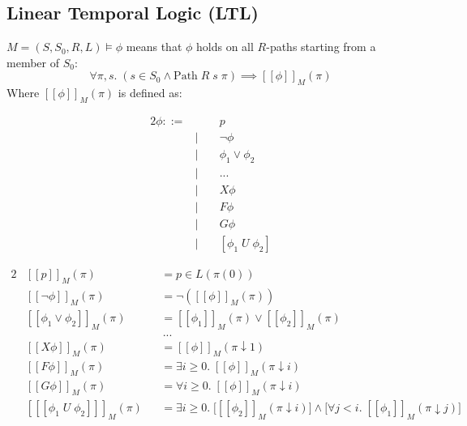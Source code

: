 \documentclass[a4paper, 11pt]{article}
\newcommand{\interp}[2][]{\mathcal{#1}[\![#2]\!]}
\begin{document}
{    \subsection*{Linear Temporal Logic (LTL)}
    {
        \(M = (S,S_0,R,L) \vDash \phi\) means that \(\phi\) holds on all \(R\)-paths starting from a member of \(S_0\):
        \[\forall \pi,s.\; (s \in S_0 \wedge \text{Path}\;R\;s\;\pi) \implies \interp{\phi}_M(\pi)\]
        Where \(\interp{\phi}_M(\pi)\) is defined as:

        \vspace{-8mm}
        \begin{minipage}[t]{0.3\textwidth}
        \begin{alignat*}{2}
        \phi ::=& \; &\;& p \tag*{Atomic proposition} \\
                & | && \neg \phi \tag*{Negation} \\
                & | && \phi_1 \vee \phi_2 \tag*{Disjunction} \\
                & | && ... \\
                & | && X\phi \tag*{Successor} \\
                & | && F\phi \tag*{Sometimes} \\
                & | && G\phi \tag*{Always} \\
                & | && [\phi_1\;U\;\phi_2] \tag*{Until}
        \end{alignat*}
        \end{minipage}
        \hspace{4mm}
        \begin{minipage}[t]{0.66\textwidth}
        \begin{alignat*}{2}
        &\interp{p}_M(\pi)                   &&= p \in L(\pi(0)) \\
        &\interp{\neg \phi}_M(\pi)           &&= \neg(\interp{\phi}_M(\pi)) \\
        &\interp{\phi_1 \vee \phi_2}_M(\pi)  &&= \interp{\phi_1}_M(\pi) \vee \interp{\phi_2}_M(\pi) \\
        &                                    &&\,... \\
        &\interp{X\phi}_M(\pi)               &&= \interp{\phi}_M(\pi \downarrow 1) \\
        &\interp{F\phi}_M(\pi)               &&= \exists i \geq 0.\; \interp{\phi}_M(\pi \downarrow i) \\
        &\interp{G\phi}_M(\pi)               &&= \forall i \geq 0.\; \interp{\phi}_M(\pi \downarrow i) \\
        &\interp{[\phi_1\;U\;\phi_2]}_M(\pi) &&= \exists i \geq 0.\; \Big[\interp{\phi_2}_M(\pi \downarrow i)\Big] \wedge \Big[\forall j < i.\; \interp{\phi_1}_M(\pi \downarrow j)\Big]
        \end{alignat*}
        \end{minipage}

}}
\end{document}
